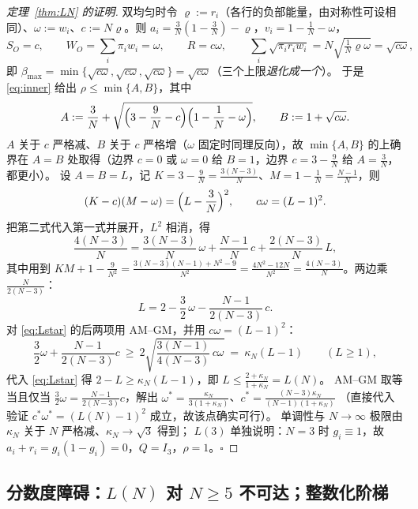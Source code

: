 \documentclass[UTF8,11pt]{ctexart}
\theoremstyle{definition}
\begin{document}
\begin{proof}[定理~\ref{thm:LN} 的证明]
双均匀时令 $\varrho:=r_i$（各行的负部能量，由对称性可设相同）、$\omega:=w_i$、$c:=N\varrho$。则
$a_i=\frac3N(1-\frac3N)-\varrho$，$v_i=1-\frac1N-\omega$，
\[
S_O=c,\qquad W_O=\sum_i\pi_iw_i=\omega,\qquad R=c\omega,\qquad
\sum_i\sqrt{\pi_ir_iw_i}=N\sqrt{\tfrac1N\varrho\omega}=\sqrt{c\omega},
\]
即 $\beta_{\max}=\min\{\sqrt{c\omega},\sqrt{c\omega},\sqrt{c\omega}\}=\sqrt{c\omega}$（三个上限\emph{退化成一个}）。
于是 \eqref{eq:inner} 给出 $\rho\le\min\{A,B\}$，其中
\[
A:=\frac3N+\sqrt{\Bigl(3-\frac9N-c\Bigr)\Bigl(1-\frac1N-\omega\Bigr)},\qquad
B:=1+\sqrt{c\omega}.
\]
$A$ 关于 $c$ 严格减、$B$ 关于 $c$ 严格增（$\omega$ 固定时同理反向），故 $\min\{A,B\}$ 的上确界在
$A=B$ 处取得（边界 $c=0$ 或 $\omega=0$ 给 $B=1$，边界 $c=3-\frac9N$ 给 $A=\frac3N$，都更小）。
设 $A=B=L$，记 $K=3-\frac9N=\frac{3(N-3)}N$、$M=1-\frac1N=\frac{N-1}N$，则
\[
(K-c)(M-\omega)=\Bigl(L-\frac3N\Bigr)^2,\qquad c\omega=(L-1)^2 .
\]
把第二式代入第一式并展开，$L^2$ 相消，得
\[
\frac{4(N-3)}N=\frac{3(N-3)}N\,\omega+\frac{N-1}N\,c+\frac{2(N-3)}N\,L,
\]
其中用到 $KM+1-\frac9{N^2}=\frac{3(N-3)(N-1)+N^2-9}{N^2}=\frac{4N^2-12N}{N^2}=\frac{4(N-3)}N$。两边乘 $\frac{N}{2(N-3)}$：
\begin{equation}\label{eq:Lstar}
L=2-\frac32\,\omega-\frac{N-1}{2(N-3)}\,c .
\end{equation}
对 \eqref{eq:Lstar} 的后两项用 AM--GM，并用 $c\omega=(L-1)^2$：
\[
\frac32\omega+\frac{N-1}{2(N-3)}c\ \ge\ 2\sqrt{\frac{3(N-1)}{4(N-3)}\,c\omega}
\ =\ \kappa_N(L-1)\qquad(L\ge1),
\]
代入 \eqref{eq:Lstar} 得 $2-L\ge\kappa_N(L-1)$，即 $L\le\frac{2+\kappa_N}{1+\kappa_N}=L(N)$。
AM--GM 取等当且仅当 $\frac32\omega=\frac{N-1}{2(N-3)}c$，解出
$\omega^*=\frac{\kappa_N}{3(1+\kappa_N)}$、$c^*=\frac{(N-3)\kappa_N}{(N-1)(1+\kappa_N)}$
（直接代入验证 $c^*\omega^*=(L(N)-1)^2$ 成立，故该点确实可行）。
单调性与 $N\to\infty$ 极限由 $\kappa_N$ 关于 $N$ 严格减、$\kappa_N\to\sqrt3$ 得到；
$L(3)$ 单独说明：$N=3$ 时 $g_i\equiv1$，故 $a_i+r_i=g_i(1-g_i)=0$，$Q=I_3$，$\rho=1$。$\square$
\end{proof}


\subsection{分数度障碍：$L(N)$ 对 $N\ge5$ 不可达；整数化阶梯}\label{sec:fracdeg}
\end{document}
